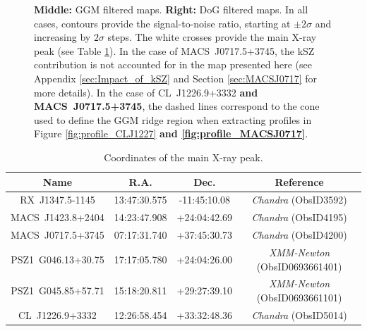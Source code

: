 \documentclass[twocolumn,traditabstract]{aa}
\begin{document}
\begin{figure}[p]
{{{\bf Middle:} GGM filtered maps.
{\bf Right:} DoG filtered maps.
In all cases, contours provide the signal-to-noise ratio, starting at $\pm 2 \sigma$ and increasing by $2 \sigma$ steps. The white crosses provide the main X-ray peak (see Table \ref{tab:xray_peak}). In the case of \mbox{MACS~J0717.5+3745}, the kSZ contribution is not accounted for in the map presented here (see Appendix \ref{sec:Impact_of_kSZ} and Section \ref{sec:MACSJ0717} for more details). In the case of \mbox{CL~J1226.9+3332} {\bf and \mbox{MACS~J0717.5+3745}}, the dashed lines correspond to the cone used to define the GGM ridge region when extracting profiles in Figure \ref{fig:profile_CLJ1227} {\bf and \ref{fig:profile_MACSJ0717}}.}}
\label{fig:NIKA_cluster_sample}
\end{figure}

\begin{table}[]
\caption{\footnotesize{Coordinates of the main X-ray peak.}}
\begin{center}
\resizebox{0.5\textwidth}{!} {
\begin{tabular}{c|c|c|c}
\hline
\hline
Name & R.A. & Dec. & Reference \\
\hline
RX~J1347.5-1145 & 13:47:30.575 & -11:45:10.08 & \textit{Chandra} (ObsID3592) \\ 
MACS~J1423.8+2404 & 14:23:47.908 & +24:04:42.69 & \textit{Chandra} (ObsID4195) \\ 
MACS~J0717.5+3745 & 07:17:31.740 & +37:45:30.73 & \textit{Chandra} (ObsID4200) \\ 
PSZ1~G046.13+30.75 & 17:17:05.780 & +24:04:26.00 & \textit{XMM-Newton} (ObsID0693661401) \\ 
PSZ1~G045.85+57.71 & 15:18:20.811 & +29:27:39.10 & \textit{XMM-Newton} (ObsID0693661101) \\ 
CL~J1226.9+3332 & 12:26:58.454 & +33:32:48.36 & \textit{Chandra} (ObsID5014) \\ 
\hline
\end{tabular}
}
\end{center}
\label{tab:xray_peak}
\end{table}
\end{document}
